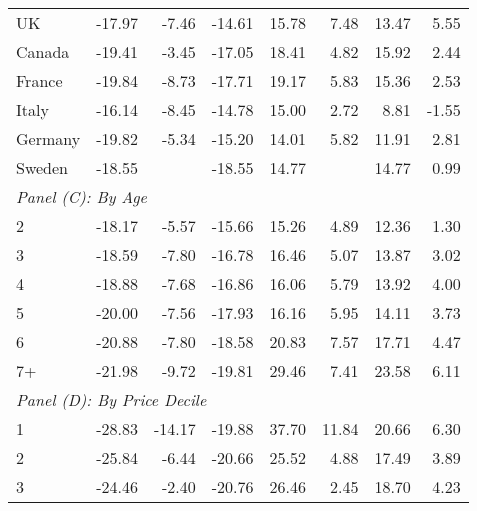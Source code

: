 \begin{table}
\begin{tabular}{lrrrrrrr}
	UK      &          -17.97 &      -7.46 &         -14.61 &            15.78 &      7.48 &          13.47 &  5.55 \\
	Canada  &          -19.41 &      -3.45 &         -17.05 &            18.41 &      4.82 &          15.92 &  2.44 \\
	France  &          -19.84 &      -8.73 &         -17.71 &            19.17 &      5.83 &          15.36 &  2.53 \\
	Italy   &          -16.14 &      -8.45 &         -14.78 &            15.00 &      2.72 &           8.81 & -1.55 \\
	Germany &          -19.82 &      -5.34 &         -15.20 &            14.01 &      5.82 &          11.91 &  2.81 \\
	Sweden  &          -18.55 &            &         -18.55 &            14.77 &           &          14.77 &  0.99 \\ \hline
	\multicolumn{8}{l}{\textit{Panel (C): By Age}}                                                                  \\ \hline
	2       &          -18.17 &      -5.57 &         -15.66 &            15.26 &      4.89 &          12.36 &  1.30 \\
	3       &          -18.59 &      -7.80 &         -16.78 &            16.46 &      5.07 &          13.87 &  3.02 \\
	4       &          -18.88 &      -7.68 &         -16.86 &            16.06 &      5.79 &          13.92 &  4.00 \\
	5       &          -20.00 &      -7.56 &         -17.93 &            16.16 &      5.95 &          14.11 &  3.73 \\
	6       &          -20.88 &      -7.80 &         -18.58 &            20.83 &      7.57 &          17.71 &  4.47 \\
	7+      &          -21.98 &      -9.72 &         -19.81 &            29.46 &      7.41 &          23.58 &  6.11 \\ \hline
	\multicolumn{8}{l}{\textit{Panel (D): By Price Decile}}                                                         \\ \hline
	1       &          -28.83 &     -14.17 &         -19.88 &            37.70 &     11.84 &          20.66 &  6.30 \\
	2       &          -25.84 &      -6.44 &         -20.66 &            25.52 &      4.88 &          17.49 &  3.89 \\
	3       &          -24.46 &      -2.40 &         -20.76 &            26.46 &      2.45 &          18.70 &  4.23 \\

\end{tabular}
\end{table}
